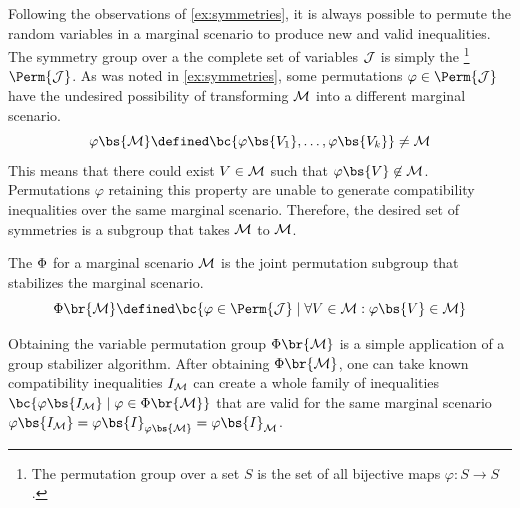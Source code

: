 \documentclass[aps, 10pt, english, twoside, pra, nofootinbib, tightenlines, longbibliography, superscriptaddress]{revtex4-1}
\begin{document}
    Following the observations of \cref{ex:symmetries}, it is always possible to permute the random variables in a marginal scenario to produce new and valid inequalities. The symmetry group over a the complete set of variables $\mathcal{J}$ is simply the \footnote{The permutation group over a set $S$ is the set of all bijective maps $\varphi : S \to S$.} $\Perm{\jointvar}$. As was noted in \cref{ex:symmetries}, some permutations $\varphi \in \Perm{\jointvar}$ have the undesired possibility of transforming $\mathcal{M}$ into a different marginal scenario.
    \[ \varphi\bs{\mscenario} \defined \bc{\varphi\bs{V_1}, \ldots, \varphi\bs{V_k}} \neq \mscenario \]
    This means that there could exist $V \in \mathcal{M}$ such that $\varphi\bs{V} \not \in \mscenario$. Permutations $\varphi$ retaining this property are unable to generate compatibility inequalities over the same marginal scenario. Therefore, the desired set of symmetries is a subgroup that takes $\mathcal{M}$ to $\mathcal{M}$.

    \begin{definition}
        The  $\Phi$ for a marginal scenario $\mathcal{M}$ is the joint permutation subgroup that stabilizes the marginal scenario.
        \[ \Phi\br{\mscenario} \defined \bc{\varphi \in \Perm{\jointvar} \mid \forall V \in \mscenario : \varphi\bs{V} \in \mscenario} \]
    \end{definition}

    Obtaining the variable permutation group $\gp\br{\mscenario}$ is a simple application of a group stabilizer algorithm. After obtaining $\gp\br{\mscenario}$, one can take known compatibility inequalities $I_{\mathcal{M}}$ can create a whole family of inequalities $\bc{\varphi\bs{I_{\mscenario}} \mid \varphi \in \gp\br{\mscenario}}$ that are valid for the same marginal scenario $\varphi\bs{I_{\mscenario}} = \varphi\bs{I}_{\varphi\bs{\mscenario}} = \varphi\bs{I}_{\mscenario}$.
\end{document}
